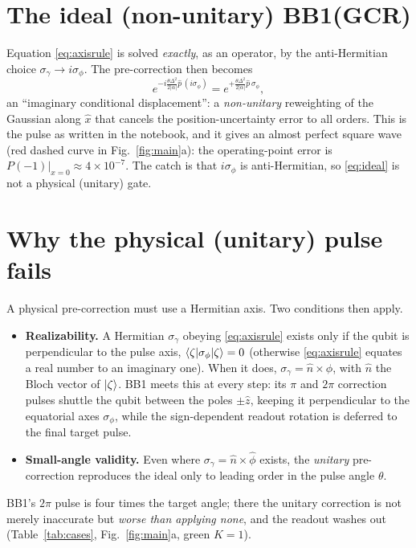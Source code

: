 \documentclass[11pt]{article}
\begin{document}
\section{The ideal (non-unitary) BB1(GCR)}
Equation \eqref{eq:axisrule} is solved \emph{exactly}, as an operator, by the anti-Hermitian
choice $\sigma_\gamma\to i\sigma_\phi$. The pre-correction then becomes
\begin{equation}
e^{-i\frac{\theta\Delta^2}{2|\alpha|}\hat p\,(i\sigma_\phi)}
= e^{+\frac{\theta\Delta^2}{2|\alpha|}\hat p\,\sigma_\phi},
\label{eq:ideal}
\end{equation}
an ``imaginary conditional displacement'': a \emph{non-unitary} reweighting of the Gaussian along
$\hat x$ that cancels the position-uncertainty error to all orders. This is the pulse as written
in the notebook, and it gives an almost perfect square wave (red dashed curve in
Fig.~\ref{fig:main}a): the operating-point error is $P(-1)|_{x=0}\approx 4\times10^{-7}$. The
catch is that $i\sigma_\phi$ is anti-Hermitian, so \eqref{eq:ideal} is not a physical (unitary)
gate.

\section{Why the physical (unitary) pulse fails}
A physical pre-correction must use a Hermitian axis. Two conditions then apply.
\begin{itemize}
\item[\textbf{(i)}] \textbf{Realizability.} A Hermitian $\sigma_\gamma$ obeying \eqref{eq:axisrule}
exists only if the qubit is perpendicular to the pulse axis, $\braket{\zeta|\sigma_\phi|\zeta}=0$
(otherwise \eqref{eq:axisrule} equates a real number to an imaginary one). When it does,
$\sigma_\gamma=\hat n\times\hat\phi$, with $\hat n$ the Bloch vector of $\ket{\zeta}$. BB1 meets
this at every step: its $\pi$ and $2\pi$ correction pulses shuttle the qubit between the poles
$\pm\hat z$, keeping it perpendicular to the equatorial axes $\sigma_\phi$, while the
sign-dependent readout rotation is deferred to the final target pulse.
\item[\textbf{(ii)}] \textbf{Small-angle validity.} Even where $\sigma_\gamma=\hat n\times\hat\phi$
exists, the \emph{unitary} pre-correction reproduces the ideal only to leading order in the pulse
angle $\theta$.
\end{itemize}
BB1's $2\pi$ pulse is four times the target angle; there the unitary correction is not merely
inaccurate but \emph{worse than applying none}, and the readout washes out
(Table~\ref{tab:cases}, Fig.~\ref{fig:main}a, green $K{=}1$).
\end{document}
